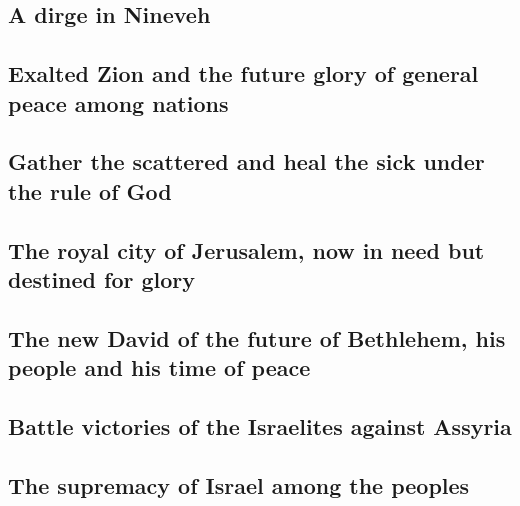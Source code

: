 \hypertarget{a-dirge-in-nineveh}{%
\subsection{A dirge in Nineveh}\label{a-dirge-in-nineveh}}

\hypertarget{exalted-zion-and-the-future-glory-of-general-peace-among-nations}{%
\subsection{Exalted Zion and the future glory of general peace among
nations}\label{exalted-zion-and-the-future-glory-of-general-peace-among-nations}}

\hypertarget{gather-the-scattered-and-heal-the-sick-under-the-rule-of-god}{%
\subsection{Gather the scattered and heal the sick under the rule of
God}\label{gather-the-scattered-and-heal-the-sick-under-the-rule-of-god}}

\hypertarget{the-royal-city-of-jerusalem-now-in-need-but-destined-for-glory}{%
\subsection{The royal city of Jerusalem, now in need but destined for
glory}\label{the-royal-city-of-jerusalem-now-in-need-but-destined-for-glory}}

\hypertarget{the-new-david-of-the-future-of-bethlehem-his-people-and-his-time-of-peace}{%
\subsection{The new David of the future of Bethlehem, his people and his
time of
peace}\label{the-new-david-of-the-future-of-bethlehem-his-people-and-his-time-of-peace}}

\hypertarget{battle-victories-of-the-israelites-against-assyria}{%
\subsection{Battle victories of the Israelites against
Assyria}\label{battle-victories-of-the-israelites-against-assyria}}

\hypertarget{the-supremacy-of-israel-among-the-peoples}{%
\subsection{The supremacy of Israel among the
peoples}\label{the-supremacy-of-israel-among-the-peoples}}

